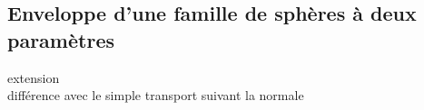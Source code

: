 

\subsection{Enveloppe d'une famille de sphères à deux paramètres}
\label{sec:EdS_2param}
extension  \cite{gelston1995}\\
différence avec le simple transport suivant la normale \cite{jiao2001}


